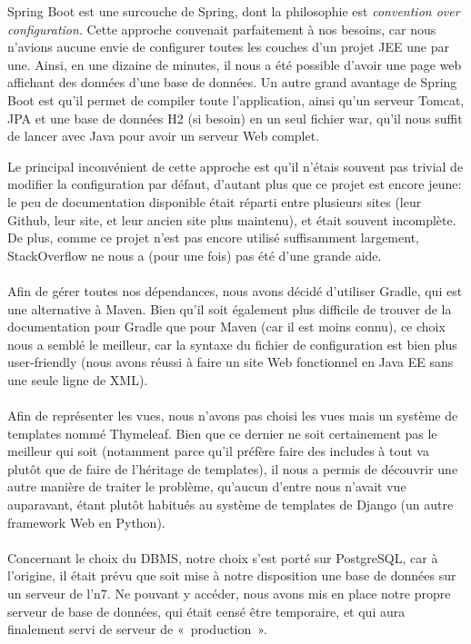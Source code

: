 \documentclass[10pt]{scrartcl}
\begin{document}
  Spring Boot est une surcouche de Spring, dont la philosophie est
  \emph{convention over configuration}. Cette approche convenait
  parfaitement à nos besoins, car nous n'avions aucune envie de
  configurer toutes les couches d'un projet JEE une par une. Ainsi,
  en une dizaine de minutes, il nous a été possible d'avoir une page
  web affichant des données d'une base de données. Un autre grand
  avantage de Spring Boot est qu'il permet de compiler toute
  l'application, ainsi qu'un serveur Tomcat, JPA et une base de
  données H2 (si besoin) en un seul fichier war, qu'il nous suffit
  de lancer avec Java pour avoir un serveur Web complet.

  Le principal inconvénient de cette approche est qu'il n'étais
  souvent pas trivial de modifier la configuration par défaut,
  d'autant plus que ce projet est encore jeune: le peu de
  documentation disponible était réparti entre plusieurs sites (leur
  Github, leur site, et leur ancien site plus maintenu), et était
  souvent incomplète. De plus, comme ce projet n'est pas encore
  utilisé suffisamment largement, StackOverflow ne nous a (pour une
  fois) pas été d'une grande aide.

  \paragraph{}
  Afin de gérer toutes nos dépendances, nous avons décidé d'utiliser
  Gradle, qui est une alternative à Maven. Bien qu'il soit également
  plus difficile de trouver de la documentation pour Gradle que pour
  Maven (car il est moins connu), ce choix nous a semblé le
  meilleur, car la syntaxe du fichier de configuration est bien plus
  user-friendly (nous avons réussi à faire un site Web fonctionnel
  en Java EE sans une seule ligne de XML).

  \paragraph{}
  Afin de représenter les vues, nous n'avons pas choisi les vues
  mais un système de templates nommé Thymeleaf. Bien que ce dernier
  ne soit certainement pas le meilleur qui soit (notamment parce
  qu'il préfère faire des includes à tout va plutôt que de faire de
  l'héritage de templates), il nous a permis de découvrir une autre
  manière de traiter le problème, qu'aucun d'entre nous n'avait vue
  auparavant, étant plutôt habitués au système de templates de Django
  (un autre framework Web en Python).

  \paragraph{}
  Concernant le choix du DBMS, notre choix s'est porté sur
  PostgreSQL, car à l'origine, il était prévu que soit mise à notre
  disposition une base de données sur un serveur de l'n7. Ne pouvant
  y accéder, nous avons mis en place notre propre serveur de base de
  données, qui était censé être temporaire, et qui aura finalement
  servi de serveur de «~production~».
\end{document}
